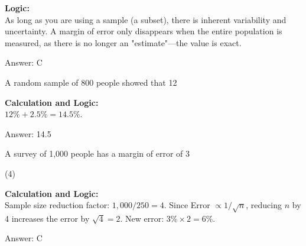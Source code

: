 \documentclass[11pt,paper=a4,answers]{exam}
\begin{document}
\begin{questions}
\begin{solution}
\textbf{Logic:} \\
As long as you are using a sample (a subset), there is inherent variability and uncertainty. A margin of error only disappears when the entire population is measured, as there is no longer an "estimate"—the value is exact.

\vspace{30pt}

Answer: \colorbox{yellow!100}{C}
\end{solution}

\vspace{60pt}

\question
A random sample of 800 people showed that 12%

\begin{solution}
\textbf{Calculation and Logic:} \\
$12\% + 2.5\% = 14.5\%$.

\vspace{30pt}

Answer: \colorbox{yellow!100}{14.5}
\end{solution}

\vspace{60pt}

\question
A survey of 1,000 people has a margin of error of 3%
\begin{tasks}(4)
\end{tasks}

\begin{solution}
\textbf{Calculation and Logic:} \\
Sample size reduction factor: $1,000 / 250 = 4$. Since Error $\propto 1/\sqrt{n}$, reducing $n$ by 4 increases the error by $\sqrt{4} = 2$. New error: $3\% \times 2 = 6\%$.

\vspace{30pt}

Answer: \colorbox{yellow!100}{C}
\end{solution}

\vspace{60pt}


\end{questions}
\end{document}
